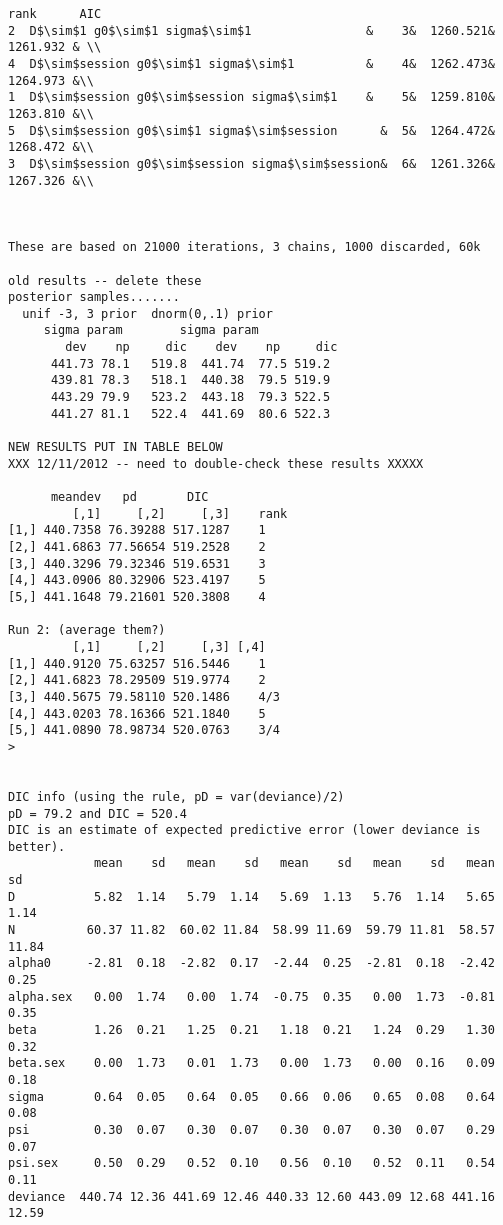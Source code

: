 \begin{verbatim}
rank      AIC
2  D$\sim$1 g0$\sim$1 sigma$\sim$1                &    3&  1260.521& 1261.932 & \\
4  D$\sim$session g0$\sim$1 sigma$\sim$1          &    4&  1262.473& 1264.973 &\\
1  D$\sim$session g0$\sim$session sigma$\sim$1    &    5&  1259.810& 1263.810 &\\
5  D$\sim$session g0$\sim$1 sigma$\sim$session      &  5&  1264.472& 1268.472 &\\
3  D$\sim$session g0$\sim$session sigma$\sim$session&  6&  1261.326& 1267.326 &\\



These are based on 21000 iterations, 3 chains, 1000 discarded, 60k

old results -- delete these
posterior samples.......
  unif -3, 3 prior  dnorm(0,.1) prior
     sigma param        sigma param
        dev    np     dic    dev    np     dic
      441.73 78.1   519.8  441.74  77.5 519.2
      439.81 78.3   518.1  440.38  79.5 519.9
      443.29 79.9   523.2  443.18  79.3 522.5
      441.27 81.1   522.4  441.69  80.6 522.3

NEW RESULTS PUT IN TABLE BELOW
XXX 12/11/2012 -- need to double-check these results XXXXX

      meandev   pd       DIC
         [,1]     [,2]     [,3]    rank
[1,] 440.7358 76.39288 517.1287    1
[2,] 441.6863 77.56654 519.2528    2
[3,] 440.3296 79.32346 519.6531    3
[4,] 443.0906 80.32906 523.4197    5
[5,] 441.1648 79.21601 520.3808    4

Run 2: (average them?)
         [,1]     [,2]     [,3] [,4]
[1,] 440.9120 75.63257 516.5446    1
[2,] 441.6823 78.29509 519.9774    2
[3,] 440.5675 79.58110 520.1486    4/3
[4,] 443.0203 78.16366 521.1840    5
[5,] 441.0890 78.98734 520.0763    3/4
> 


DIC info (using the rule, pD = var(deviance)/2)
pD = 79.2 and DIC = 520.4
DIC is an estimate of expected predictive error (lower deviance is better).
            mean    sd   mean    sd   mean    sd   mean    sd   mean    sd
D           5.82  1.14   5.79  1.14   5.69  1.13   5.76  1.14   5.65  1.14
N          60.37 11.82  60.02 11.84  58.99 11.69  59.79 11.81  58.57 11.84
alpha0     -2.81  0.18  -2.82  0.17  -2.44  0.25  -2.81  0.18  -2.42  0.25
alpha.sex   0.00  1.74   0.00  1.74  -0.75  0.35   0.00  1.73  -0.81  0.35
beta        1.26  0.21   1.25  0.21   1.18  0.21   1.24  0.29   1.30  0.32
beta.sex    0.00  1.73   0.01  1.73   0.00  1.73   0.00  0.16   0.09  0.18
sigma       0.64  0.05   0.64  0.05   0.66  0.06   0.65  0.08   0.64  0.08
psi         0.30  0.07   0.30  0.07   0.30  0.07   0.30  0.07   0.29  0.07
psi.sex     0.50  0.29   0.52  0.10   0.56  0.10   0.52  0.11   0.54  0.11
deviance  440.74 12.36 441.69 12.46 440.33 12.60 443.09 12.68 441.16 12.59



\end{verbatim}
